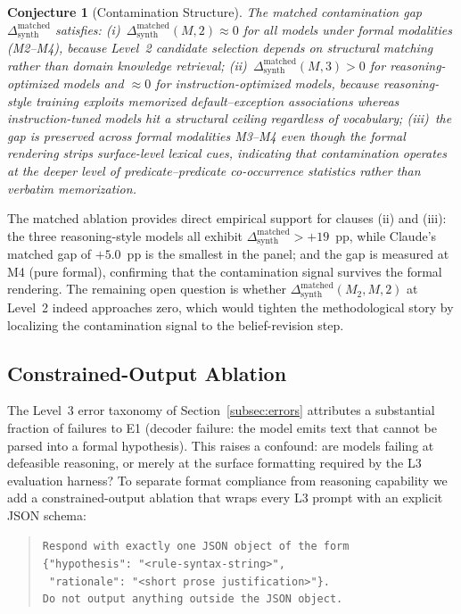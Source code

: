 \documentclass{article}
\newtheorem{conjecture}[theorem]{Conjecture}
\theoremstyle{definition}
\begin{document}
\begin{conjecture}[Contamination Structure]\label{conj:contam}
The matched contamination gap $\Delta_{\mathrm{synth}}^{\mathrm{matched}}$ satisfies: (i)~$\Delta_{\mathrm{synth}}^{\mathrm{matched}}(M, 2) \approx 0$ for all models under formal modalities (M2--M4), because Level~2 candidate selection depends on structural matching rather than domain knowledge retrieval; (ii)~$\Delta_{\mathrm{synth}}^{\mathrm{matched}}(M, 3) > 0$ for reasoning-optimized models and $\approx 0$ for instruction-optimized models, because reasoning-style training exploits memorized default--exception associations whereas instruction-tuned models hit a structural ceiling regardless of vocabulary; (iii)~the gap is preserved across formal modalities M3--M4 even though the formal rendering strips surface-level lexical cues, indicating that contamination operates at the deeper level of predicate--predicate co-occurrence statistics rather than verbatim memorization.
\end{conjecture}

The matched ablation provides direct empirical support for clauses (ii) and (iii): the three reasoning-style models all exhibit $\Delta_{\mathrm{synth}}^{\mathrm{matched}} > +19$~pp, while Claude's matched gap of $+5.0$~pp is the smallest in the panel; and the gap is measured at M4 (pure formal), confirming that the contamination signal survives the formal rendering. The remaining open question is whether $\Delta_{\mathrm{synth}}^{\mathrm{matched}}(M_2, M, 2)$ at Level~2 indeed approaches zero, which would tighten the methodological story by localizing the contamination signal to the belief-revision step.


\subsection{Constrained-Output Ablation}\label{subsec:constrained_results}

The Level~3 error taxonomy of Section~\ref{subsec:errors} attributes a substantial fraction of failures to E1 (decoder failure: the model emits text that cannot be parsed into a formal hypothesis). This raises a confound: are models failing at defeasible reasoning, or merely at the surface formatting required by the L3 evaluation harness? To separate format compliance from reasoning capability we add a constrained-output ablation that wraps every L3 prompt with an explicit JSON schema:

\begin{quote}\small
\texttt{Respond with exactly one JSON object of the form}\\
\texttt{\{"hypothesis": "<rule-syntax-string>",}\\
\texttt{ "rationale": "<short prose justification>"\}.}\\
\texttt{Do not output anything outside the JSON object.}
\end{quote}
\end{document}
